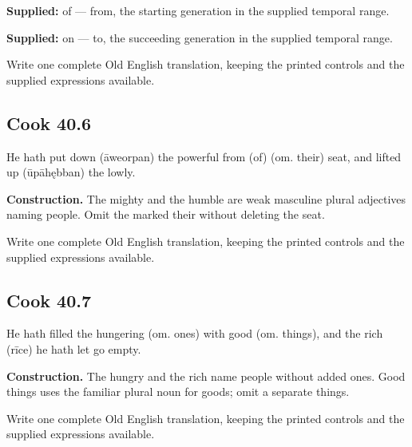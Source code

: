 \textbf{Supplied:} of — from, the starting generation in the supplied temporal range.

\textbf{Supplied:} on — to, the succeeding generation in the supplied temporal range.

Write one complete Old English translation, keeping the printed controls and the supplied expressions available.

\par\begin{minipage}{\linewidth}\raggedright
\subsection*{Cook 40.6}

He hath put down (āweorpan) the powerful from (of) (om. their) seat, and lifted up (ūpāhębban) the lowly.

\textbf{Construction.} The mighty and the humble are weak masculine plural adjectives naming people. Omit the marked their without deleting the seat.

Write one complete Old English translation, keeping the printed controls and the supplied expressions available.

\end{minipage}\par\addvspace{4pt}

\par\begin{minipage}{\linewidth}\raggedright
\subsection*{Cook 40.7}

He hath filled the hungering (om. ones) with good (om. things), and the rich (rīce) he hath let go empty.

\textbf{Construction.} The hungry and the rich name people without added ones. Good things uses the familiar plural noun for goods; omit a separate things.

Write one complete Old English translation, keeping the printed controls and the supplied expressions available.

\end{minipage}\par\addvspace{4pt}

